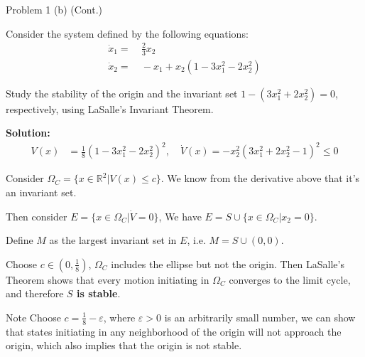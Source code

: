 \documentclass[8pt]{beamer}
\let\tempone\itemize
\let\temptwo\enditemize
\newenvironment{proitemize}{\vspace{-1em}\tempone}{\temptwo}%
\begin{document}
\begin{frame}[t]{Problem 1 (b) (Cont.)}%
  \begin{block}{}
  Consider the system defined by the following equations:
  \begin{align*}
    \dot x_1=&~\frac{2}{3}x_2\\
    \dot x_2=&~-x_1+x_2(1-3x_1^2-2x_2^2)
\end{align*}
  \begin{proitemize}
    \item[(b)] Study the stability of the origin and the invariant set $1-(3x_1^2+2x_2^2)=0$, respectively, using LaSalle's Invariant Theorem.
  \end{proitemize}
\end{block}
  {\bf Solution:} 
  \begin{align*}
    V(x)&=\frac{1}{8}(1-3x_1^2-2x_2^2)^2,\quad
     \dot{V}(x)=-x_2^2(3x_1^2+2x_2^2-1)^2 \le 0 
  \end{align*} 
  
  Consider $\Omega_C=\{x \in \mathbb{R}^2|V(x) \le c\}$. We know from the derivative above that it's an invariant set. 
  
  Then consider $E=\{x \in \Omega_C | \dot{V}=0 \}$, We have $E=S \cup \{x \in \Omega_C|x_2=0\}$. 
  
  Define $M$ as the largest invariant set in $E$, i.e. $M=S \cup (0,0)$.

  Choose $c \in (0,\frac{1}{8})$, $\Omega_C$ includes the ellipse but not the origin. Then LaSalle's Theorem shows that every motion initiating in $\Omega_C$ converges to the limit cycle, and therefore \textbf{$S$ is stable}.

  \begin{block}{Note}
    {\small Choose $c=\frac{1}{8}-\varepsilon$, where $\varepsilon>0$ is an arbitrarily small number, we can show that states initiating in any neighborhood of the origin will not approach the origin, which also implies that the origin is not stable.}
  \end{block}
\end{frame}

\end{document}
